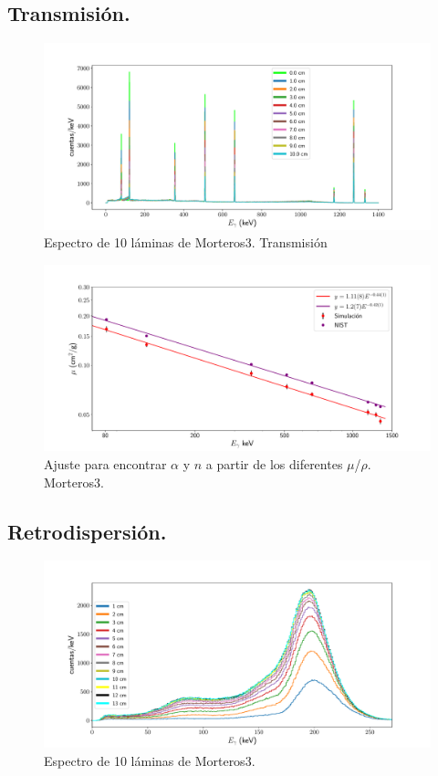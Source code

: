  \subsection{Transmisión.}
 
\begin{figure}[H]
	\centering
	\includegraphics[width=1.0\linewidth]{Kap4/espectro_m3-M10-trans.pdf}
	\caption{Espectro de 10 láminas de Morteros3. Transmisión}
	\label{fig:espectrom3-m10-trans}
\end{figure}
 
\begin{figure}[H]
	\centering
	\includegraphics[width=1.0\linewidth]{Kap4/mu-trans-m3.pdf}
	\caption{Ajuste para encontrar $\alpha$ y $n$ a partir de los diferentes $\mu$/$\rho$. Morteros3.}
	\label{fig:mu-trans-m3}
\end{figure}
 
 
 \subsection{Retrodispersión.}
 
\begin{figure}[H]
	\centering
	\includegraphics[width=1.0\linewidth]{Kap4/espectro_m3.pdf}
	\caption{Espectro de 10 láminas de Morteros3.}
	\label{fig:espectrom3}
\end{figure}

